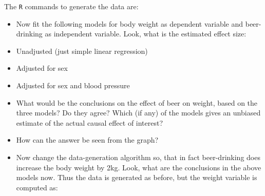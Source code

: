 \documentclass[
]{book}
\newenvironment{Shaded}{\begin{snugshade}}{\end{snugshade}}
\newcommand{\AttributeTok}[1]{\textcolor[rgb]{0.13,0.29,0.53}{#1}}
\newcommand{\CommentTok}[1]{\textcolor[rgb]{0.56,0.35,0.01}{\textit{#1}}}
\newcommand{\DecValTok}[1]{\textcolor[rgb]{0.00,0.00,0.81}{#1}}
\newcommand{\FloatTok}[1]{\textcolor[rgb]{0.00,0.00,0.81}{#1}}
\newcommand{\FunctionTok}[1]{\textcolor[rgb]{0.13,0.29,0.53}{\textbf{#1}}}
\newcommand{\NormalTok}[1]{#1}
\newcommand{\OtherTok}[1]{\textcolor[rgb]{0.56,0.35,0.01}{#1}}
\newcommand{\SpecialCharTok}[1]{\textcolor[rgb]{0.81,0.36,0.00}{\textbf{#1}}}
\begin{document}
The \texttt{R} commands to generate the data are:

\begin{Shaded}
\end{Shaded}

\begin{itemize}
\item
  Now fit the following models for body weight as dependent
  variable and beer-drinking as independent variable. Look, what is
  the estimated effect size:
\item
  Unadjusted (just simple linear regression)
\item
  Adjusted for sex
\item
  Adjusted for sex and blood pressure
\item
  What would be the conclusions on the effect of beer on weight, based on the three models? Do they agree?
  Which (if any) of the models gives an unbiased estimate of the
  actual causal effect of interest?
\item
  How can the answer be seen from the graph?
\item
  Now change the data-generation algorithm so, that in fact beer-drinking
  does increase the body weight by 2kg. Look, what are
  the conclusions in the above models now.
  Thus the data is generated as before, but the weight variable is computed as:
\end{itemize}
\end{document}

